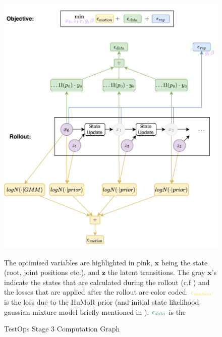 \begin{figure}[!ht]
    \label{fig:humor_rollout_graph}
    \centering
    \includegraphics[width=1\textwidth]{Figures/humor/improvement/computation_graph_humor.png}
    \caption{TestOps Stage 3 Computation Graph}
    \medskip
    \small
    The optimised variables are highlighted in pink, $\mathbf{x}$ being the state (root, joint positions etc.), and $\mathbf{z}$ the latent transitions. The gray $\mathbf{x}$'s indicate the states that are calculated during the rollout (c.f ) and the losses that are applied after the rollout are color coded. $\textcolor{Goldenrod}{\epsilon_{motion}}$ is the loss due to the HuMoR prior (and initial state likelihood gaussian mixture model briefly mentioned in ). $\textcolor{ForestGreen}{\epsilon_{data}}$ is the 
\end{figure}

